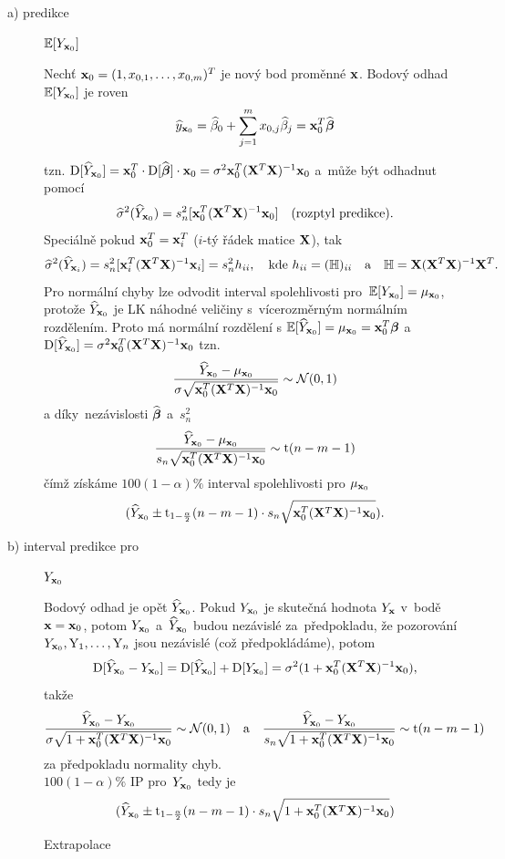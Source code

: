 \begin{description}
	\item[a) predikce] $\mathbb{E} [Y_{\mathbf{x}_0}]$

Nechť $\mathbf{x}_0 = (1, x_{0,1},\dots, x_{0,m})^T$ je nový bod proměnné $\mathbf{x}$. Bodový odhad $\mathbb{E} [Y_{\mathbf{x}_0}]$ je roven
 $$
 \widehat{y}_{\mathbf{x}_0} = \widehat{\beta}_0 + \sum_{j = 1}^m x_{0,j} \widehat{\beta}_j = \mathbf{x}_0^T \widehat{\boldsymbol{\beta}}
 $$

tzn. $\mathrm{D} [\widehat{Y}_{\mathbf{x}_0}] = \mathbf{x}_0^T \cdot \mathrm{D} [\widehat{\boldsymbol{\beta}}] \cdot \mathbf{x}_0 = \sigma^2 \mathbf{x}_0^T(\mathbf{X}^T \mathbf{X})^{-1} \mathbf{x}_0$ a~může být odhadnut pomocí
 $$
 \widehat{\sigma}^2(\widehat{Y}_{\mathbf{x}_0}) = s_n^2 [\mathbf{x}_0^T(\mathbf{X}^T \mathbf{X})^{-1} \mathbf{x}_0] \quad \text{(rozptyl predikce)}.
 $$
 Speciálně pokud $\mathbf{x}_0^T = \mathbf{x}_i^T$ ($i$-tý řádek matice $\mathbf{X}$), tak
 $$
  \widehat{\sigma}^2(\widehat{Y}_{\mathbf{x}_i}) = s_n^2 [\mathbf{x}_i^T(\mathbf{X}^T \mathbf{X})^{-1} \mathbf{x}_i] = s_n^2 h_{ii}, \quad \text{kde } h_{ii} = (\mathbb{H})_{ii} \quad \text{a} \quad \mathbb{H} = \mathbf{X} (\mathbf{X}^T  \mathbf{X})^{-1} \mathbf{X}^T.
 $$
Pro normální chyby lze odvodit interval spolehlivosti pro~$\mathbb{E} [Y_{\mathbf{x}_0}] = \mu_{\mathbf{x}_0}$, protože $\widehat{Y}_{\mathbf{x}_0}$ je LK náhodné veličiny s~vícerozměrným normálním rozdělením. Proto má normální rozdělení s $\mathbb{E} [\widehat{Y}_{\mathbf{x}_0}] = \mu_{\mathbf{x}_0} = \mathbf{x}_0^T \boldsymbol{\beta}$ a~$\mathrm{D} [\widehat{Y}_{\mathbf{x}_0}] = \sigma^2 \mathbf{x}_0^T(\mathbf{X}^T \mathbf{X})^{-1} \mathbf{x}_0$
tzn.
 $$
\frac{\widehat{Y}_{\mathbf{x}_0} - \mu_{\mathbf{x}_0}}{\sigma \sqrt{\mathbf{x}_0^T(\mathbf{X}^T \mathbf{X})^{-1} \mathbf{x}_0}} \sim \mathcal{N}(0,1)
 $$
a díky~nezávislosti $\widehat{\boldsymbol{\beta}}$ a~$s_n^2$
 $$
 \frac{\widehat{Y}_{\mathbf{x}_0} - \mu_{\mathbf{x}_0}}{s_n \sqrt{\mathbf{x}_0^T(\mathbf{X}^T \mathbf{X})^{-1} \mathbf{x}_0}} \sim \mathrm{t}(n-m-1)
 $$
 čímž získáme $100(1-\alpha)\%$ interval spolehlivosti pro $\mu_{\mathbf{x}_0}$
 $$
   (\widehat{Y}_{\mathbf{x}_0} \pm \mathrm{t}_{1-\frac{\alpha}{2}}(n-m-1) \cdot s_n \sqrt{\mathbf{x}_0^T(\mathbf{X}^T \mathbf{X})^{-1} \mathbf{x}_0}).
 $$

\item[b) interval predikce pro] $Y_{\mathbf{x}_0}$

Bodový odhad je opět $\widehat{Y}_{\mathbf{x}_0}$. Pokud $Y_{\mathbf{x}_0}$ je skutečná hodnota $Y_{\mathbf{x}}$ v~bodě $\mathbf{x} = \mathbf{x}_0$, potom $Y_{\mathbf{x}_0}$ a~$\widehat{Y}_{\mathbf{x}_0}$ budou nezávislé za~předpokladu, že pozorování $Y_{\mathbf{x}_0}, \text{Y}_1,\dots, \text{Y}_n$ jsou nezávislé (což předpokládáme),
potom
 $$
\mathrm{D} [\widehat{Y}_{\mathbf{x}_0} - Y_{\mathbf{x}_0}] = \mathrm{D} [\widehat{Y}_{\mathbf{x}_0}] + \mathrm{D} [Y_{\mathbf{x}_0}] = \sigma^2(1+ \mathbf{x}_0^T(\mathbf{X}^T \mathbf{X})^{-1} \mathbf{x}_0),
 $$
takže
 $$
\frac{\widehat{Y}_{\mathbf{x}_0} - Y_{\mathbf{x}_0}}{\sigma \sqrt{1+ \mathbf{x}_0^T(\mathbf{X}^T \mathbf{X})^{-1} \mathbf{x}_0 }} \sim \mathcal{N}(0,1) \quad \text{a} \quad \frac{\widehat{Y}_{\mathbf{x}_0} - Y_{\mathbf{x}_0}}{s_n \sqrt{1+ \mathbf{x}_0^T(\mathbf{X}^T \mathbf{X})^{-1} \mathbf{x}_0 }} \sim \mathrm{t}(n-m-1)
 $$
za předpokladu normality chyb. \\
 $100(1-\alpha) \%$ IP pro~$Y_{\mathbf{x}_0}$ tedy je
 $$
 (\widehat{Y}_{\mathbf{x}_0} \pm \mathrm{t}_{1 - \frac{\alpha}{2}}(n-m-1) \cdot s_n \sqrt{1+ \mathbf{x}_0^T(\mathbf{X}^T \mathbf{X})^{-1} \mathbf{x}_0 })
 $$
\begin{example}
\end{example}
	\begin{remark}
		Extrapolace
		

\end{remark}
\end{description}
